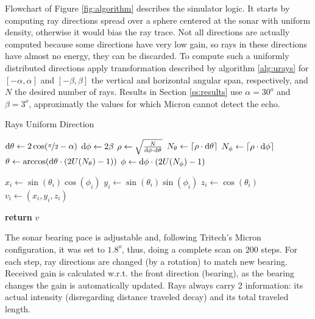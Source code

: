 Flowchart of Figure \ref{fig:algorithm} describes the simulator logic. It starts
by computing ray directions spread over a sphere centered at the sonar with
uniform density, otherwise it would bias the ray trace. Not all directions are
actually computed because some directions have very low gain, so rays in these directions
have almost no energy, they can be discarded. To compute such a uniformly
distributed directions apply transformation described by algorithm
\ref{alg:urays} for $[-\alpha,\alpha]$ and $[-\beta,\beta]$ the vertical and
horizontal angular span, respectively, and $N$ the desired number of rays.
Results in Section \ref{ss:results} use $\alpha = 30^o$ and $\beta = 3^o$,
approximatly the values for which Micron cannot detect the echo. 


\begin{algorithm}
\caption{Rays Uniform Direction}
\label{alg:urays}
\begin{algorithmic}

\State $\mathrm{d}\theta \gets 2\cos(\nicefrac{\pi}{2}-\alpha)$
\State $\mathrm{d}\phi \gets 2\beta $
\State $\rho \gets \sqrt{\frac{N}{\mathrm{d}\phi\cdot\mathrm{d}\theta}}$ 
\State $N_\theta \gets \lceil\rho\cdot\mathrm{d}\theta\rceil$
\State $N_\phi \gets \lceil\rho\cdot\mathrm{d}\phi\rceil$
\State $\theta \gets \arccos(\mathrm{d}\theta\cdot (2U(N_\theta)-1))$ 
\State $\phi \gets \mathrm{d}\phi\cdot (2U(N_\phi)-1)$

\State $x_i \gets \sin(\theta_i)\cos(\phi_i)$
\State $y_i \gets \sin(\theta_i)\sin(\phi_i)$
\State $z_i \gets \cos(\theta_i)$
\State $v_i \gets (x_i,y_i,z_i)$
\EndFor

\State \textbf{return} $v$
\EndProcedure
\end{algorithmic}
\end{algorithm}

The sonar bearing pace is adjustable and, following Tritech's Micron
configuration, it was set to $1.8^o$, thus, doing a complete scan on $200$ steps. For each step, ray
directions are changed (by a rotation) to match new bearing. Received gain is
calculated w.r.t. the front direction (bearing), as the bearing changes the gain
is automatically updated. Rays always carry 2 information: its actual
intensity (disregarding distance traveled decay) and its total traveled length.

